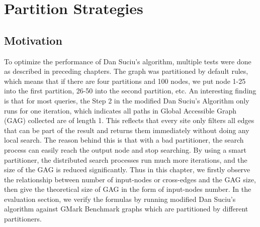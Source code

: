 \chapter{\label{cha:par-str}Partition Strategies}
\section{Motivation}
To optimize the performance of Dan Suciu's algorithm, multiple tests were done as described in preceding chapters. The graph was partitioned by default rules, which means that if there are four partitions and 100 nodes, we put node 1-25 into the first partition, 26-50 into the second partition, etc. An interesting finding is that for most queries, the Step 2 in the modified Dan Suciu's Algorithm only runs for one iteration, which indicates all paths in Global Accessible Graph (GAG) collected are of length 1. This reflects that every site only filters all edges that can be part of the result and returns them immediately without doing any local search. The reason behind this is that with a bad partitioner, the search process can easily reach the output node and stop searching. By using a smart partitioner, the distributed search processes run much more iterations, and the size of the GAG is reduced significantly. Thus in this chapter, we firstly observe the relationship between number of input-nodes or cross-edges and the GAG size, then give the theoretical size of GAG in the form of input-nodes number. In the evaluation section, we verify the formulas by running modified Dan Suciu's algorithm against GMark Benchmark graphs which are partitioned by different partitioners.
